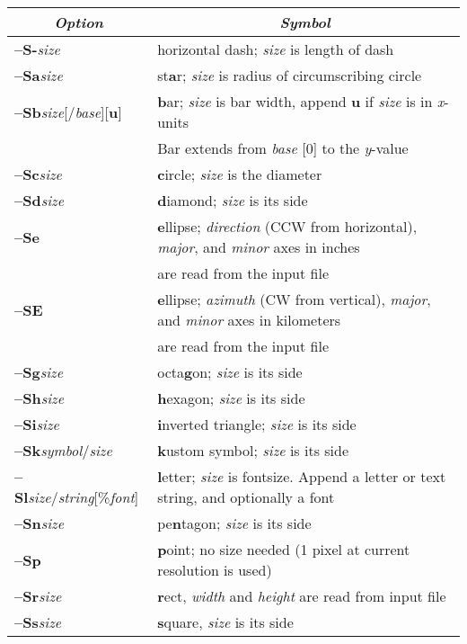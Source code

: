 \documentclass{report}
\newcommand{\Opt}[1]{{\bf --#1}}%
\newcommand{\Opt}[1]{{\bf -#1}}%
\begin{document}
\begin{table}[h]
\small
\centering
\begin{tabular}{|l|l|} \hline
\multicolumn{1}{|c|}{\emph{Option}} & \multicolumn{1}{c|}{\emph{Symbol}} \\ \hline 
\Opt{S-}{\it size} & horizontal dash; {\it size} is length of dash \\ \hline
\Opt{Sa}{\it size} & st{\bf a}r; {\it size} is radius of circumscribing circle \\ \hline
\Opt{Sb}{\it size}[/{\it base}][{\bf u}] & {\bf b}ar; {\it size} is bar width, append {\bf u} if {\it size} is in {\it x}-units \\
 & Bar extends from {\it base} [0] to the {\it y}-value \\ \hline
\Opt{Sc}{\it size} & {\bf c}ircle; {\it size} is the diameter \\ \hline
\Opt{Sd}{\it size} & {\bf d}iamond; {\it size} is its side \\ \hline
\Opt{Se} & {\bf e}llipse; {\it direction} (CCW from horizontal), {\it major}, and {\it minor} axes in inches \\
 & are read from the input file \\ \hline
\Opt{SE} & {\bf e}llipse; {\it azimuth} (CW from vertical), {\it major}, and {\it minor} axes in kilometers \\
 & are read from the input file\\ \hline
\Opt{Sg}{\it size} & octa{\bf g}on; {\it size} is its side \\ \hline
\Opt{Sh}{\it size} & {\bf h}exagon; {\it size} is its side \\ \hline
\Opt{Si}{\it size} & {\bf i}nverted triangle; {\it size} is its side \\ \hline
\Opt{Sk}{\it symbol}/{\it size} & {\bf k}ustom symbol; {\it size} is its side \\ \hline
\Opt{Sl}{\it size}/{\it string}[\%{\it font}] & {\bf l}etter; {\it size} is fontsize.  Append a letter or text string, and optionally a font \\ \hline
\Opt{Sn}{\it size} & pe{\bf n}tagon; {\it size} is its side \\ \hline
\Opt{Sp} & {\bf p}oint; no size needed (1 pixel at current resolution is used) \\ \hline
\Opt{Sr}{\it size} & {\bf r}ect, {\it width} and {\it height} are read from input file \\ \hline
\Opt{Ss}{\it size} & {\bf s}quare, {\it size} is its side \\ \hline

\end{tabular}
\end{table}
\end{document}
